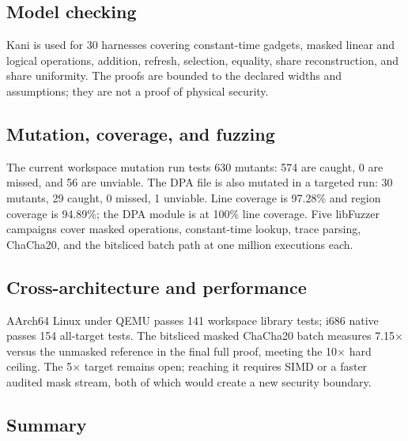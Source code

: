 \documentclass[11pt,a4paper]{article}
\theoremstyle{plain}
\theoremstyle{definition}
\theoremstyle{remark}
\begin{document}
\subsection{Model checking}

Kani \citep{kani} is used for 30 harnesses covering constant-time gadgets, masked linear
and logical operations, addition, refresh, selection, equality, share reconstruction,
and share uniformity. The proofs are bounded to the declared widths and assumptions;
they are not a proof of physical security.

\subsection{Mutation, coverage, and fuzzing}

The current workspace mutation run tests 630 mutants: 574 are caught, 0 are missed, and
56 are unviable. The DPA file is also mutated in a targeted run: 30 mutants, 29 caught,
0 missed, 1 unviable. Line coverage is 97.28\% and region coverage is 94.89\%; the DPA
module is at 100\% line coverage. Five libFuzzer campaigns cover masked operations,
constant-time lookup, trace parsing, ChaCha20, and the bitsliced batch path at one
million executions each.

\subsection{Cross-architecture and performance}

AArch64 Linux under QEMU passes 141 workspace library tests; i686 native passes 154
all-target tests. The bitsliced masked ChaCha20 batch measures 7.15$\times$ versus the
unmasked reference in the final full proof, meeting the 10$\times$ hard ceiling. The
5$\times$ target remains open; reaching it requires SIMD or a faster audited mask
stream, both of which would create a new security boundary.

\subsection{Summary}
\end{document}
